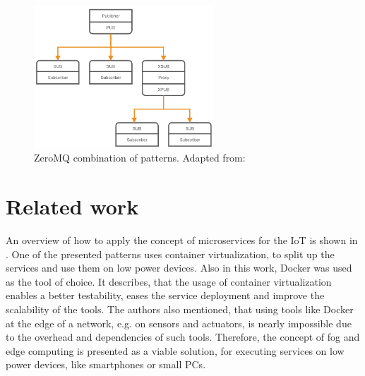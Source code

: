 \begin{figure}[H]
    \centering
    \includegraphics[width=0.6\textwidth]{resources/images/zeromq-complex.png}
    \caption[ZeroMQ combination of patterns]{ZeroMQ combination of patterns. Adapted from: \autocite{ZeroMQ:Guide}}
    \label{fig:zeromq_comination}
\end{figure}


\section{Related work}
\label{section:related_work}
An overview of how to apply the concept of microservices for the \ac{IoT} is shown in \autocite{Butzin:2016}.
One of the presented patterns uses container virtualization, to split up the services and use them on low power devices.
Also in this work, Docker was used as the tool of choice.
It describes, that the usage of container virtualization enables a better testability, eases the service deployment and improve the scalability of the tools.\autocite[cf.][p. 5]{Butzin:2016}
The authors also mentioned, that using tools like Docker at the edge of a network, e.g. on sensors and actuators, is nearly impossible due to the overhead and dependencies of such tools.\autocite[cf.][p. 5]{Butzin:2016}
Therefore, the concept of fog and edge computing is presented as a viable solution, for executing services on low power devices, like smartphones or small \acp{PC}.\autocite[cf.][p. 5]{Butzin:2016}

